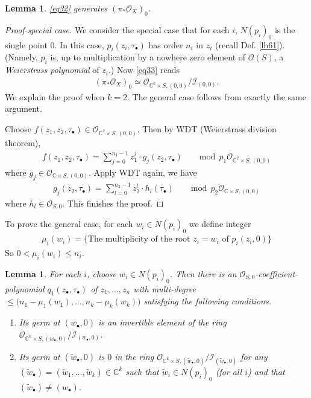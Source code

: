 \documentclass[12pt,b5paper,notitlepage]{report}
\theoremstyle{definition}
\theoremstyle{plain}
\newtheorem{lm}[df]{Lemma}
\newcommand{\mc}{\mathcal}
\newcommand{\wtd}{\widetilde}
\newcommand{\scr}{\mathscr}
\newcommand{\blt}{\bullet}
\newcommand{\Cbb}{\mathbb C}
\numberwithin{equation}{section}
\begin{document}
\begin{lm}\label{lb62}
\eqref{eq32} generates $(\pi_*\scr O_X)_0$.
\end{lm}
\begin{proof}[Proof-special case]
We consider the special case that for each $i$, $N(p_i)_0$ is the single point $0$. In this case, $p_i(z_i,\tau_\blt)$ has order $n_i$ in $z_i$ (recall Def. \ref{lb61}). (Namely, $p_i$ is, up to multiplication by a nowhere zero element of $\scr O(S)$, a \textit{Weierstrass polynomial} of $z_i$.) Now \eqref{eq33} reads
\begin{align*}
(\pi_*\scr O_X)_0\simeq \scr O_{\Cbb^k\times S,(0,0)}/\mc I_{(0,0)}.
\end{align*}
We explain the proof when $k=2$. The general case follows from exactly the same argument.

Choose $f(z_1,z_2,\tau_\blt)\in\scr O_{\Cbb^2\times S,(0,0)}$. Then by WDT (Weierstrass division theorem), 
\begin{align*}
f(z_1,z_2,\tau_\blt)=\sum_{j=0}^{n_1-1}z_1^j\cdot g_j(z_2,\tau_\blt)\qquad \mathrm{mod~~}p_1\scr O_{\Cbb^2\times S,(0,0)}
\end{align*}
where $g_j\in\scr O_{\Cbb\times S,(0,0)}$. Apply WDT again, we have
\begin{align*}
g_j(z_2,\tau_\blt)=\sum_{l=0}^{n_2-1}z_2^l\cdot h_l(\tau_\blt)\qquad \mathrm{mod~~}p_2\scr O_{\Cbb\times S,(0,0)}
\end{align*}
where $h_l\in\scr O_{S,0}$. This finishes the proof.
\end{proof}

To prove the general case, for each $w_i\in N(p_i)_0$ we define integer
\begin{align*}
\mu_i(w_i)=\{\text{The multiplicity of the root }z_i=w_i\text{ of }p_i(z_i,0)\}
\end{align*}
So $0<\mu_i(w_i)\leq n_i$.

\begin{lm}\label{lb63}
For each $i$, choose $w_i\in N(p_i)_0$. Then there is an $\scr O_{S,0}$-coefficient-polynomial $q_1(z_\blt,\tau_\blt)$ of $z_1,\dots,z_n$ with multi-degree $\leq \big(n_1-\mu_1(w_1),\dots,n_k-\mu_k(w_k)\big)$ satisfying the following conditions.
\begin{enumerate}[label=(\arabic*)]
\item Its germ at $(w_\blt,0)$ is an invertible element of the ring $\scr O_{\Cbb^k\times S,(w_\blt,0)}/\mc I_{(w_\blt,0)}$. 
\item Its germ at $(\wtd w_\blt,0)$ is $0$ in the ring $\scr O_{\Cbb^k\times S,(\wtd w_\blt,0)}/\mc I_{(\wtd w_\blt,0)}$ for any $(\wtd w_\blt)=(\wtd w_1,\dots,\wtd w_k)\in\Cbb^k$ such that $\wtd w_i\in N(p_i)_0$ (for all $i$) and that $(\wtd w_\blt)\neq (w_\blt)$.
\end{enumerate}
\end{lm}
\end{document}
